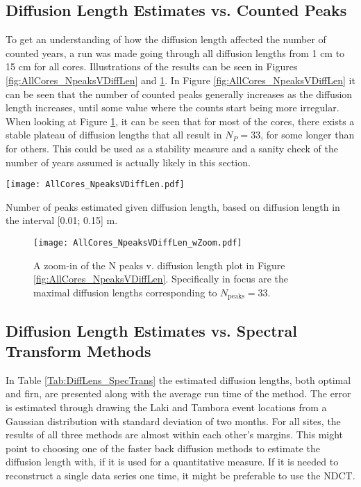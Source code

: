 \documentclass[../../CompleteThesis2/Complete_2ndDraft]{subfiles}
\begin{document}
\subsection[Diffusion Length V N Peaks]{Diffusion Length Estimates vs. Counted Peaks}
\label{Subsec:Results_DiffLenEst_AlphabetCores_DiffLenVPeaks}
To get an understanding of how the diffusion length affected the number of counted years, a run was made going through all diffusion lengths from 1 cm to 15 cm for all cores. Illustrations of the results can be seen in Figures \ref{fig:AllCores_NpeaksVDiffLen} and \ref{fig:AllCores_NpeaksVDiffLenZoom}. In Figure \ref{fig:AllCores_NpeaksVDiffLen} it can be seen that the number of counted peaks generally increases as the diffusion length increases, until some value where the counts start being more irregular. 
When looking at Figure \ref{fig:AllCores_NpeaksVDiffLenZoom}, it can be seen that for most of the cores, there exists a stable plateau of diffusion lengths that all result in $N_P=33$, for some longer than for others. This could be used as a stability measure and a sanity check of the number of years assumed is actually likely in this section. 

\begin{marginfigure}
	\centering
	\texttt{[image: AllCores\_NpeaksVDiffLen.pdf]}
	\caption[$\sigma$ vs. N Peaks]{\footnotesize Number of peaks estimated given diffusion length, based on diffusion length in the interval [0.01; 0.15] m.}
	\label{fig:AllCores_NpeaksVDiffLen}
\end{marginfigure}

\begin{figure}[h]
	\centering
	\texttt{[image: AllCores\_NpeaksVDiffLen\_wZoom.pdf]}
	\caption[$\sigma$ vs. N Peaks]{\small A zoom-in of the N peaks v. diffusion length plot in Figure \ref{fig:AllCores_NpeaksVDiffLen}. Specifically in focus are the maximal diffusion lengths corresponding to $N_{\text{peaks}}=33$.}
	\label{fig:AllCores_NpeaksVDiffLenZoom}
\end{figure}



\subsection[$\sigma$ v. Spectral Transforms]{Diffusion Length Estimates vs. Spectral Transform Methods}
\label{Subsec:Results_DiffLenEst_AlphabetCores_SpectralTransforms}
In Table \ref{Tab:DiffLens_SpecTrans} the estimated diffusion lengths, both optimal and firn, are presented along with the average run time of the method. The error is estimated through drawing the Laki and Tambora event locations from a Gaussian distribution with standard deviation of two months. For all sites, the results of all three methods are almost within each other's margins. This might point to choosing one of the faster back diffusion methods to estimate the diffusion length with, if it is used for a quantitative measure. If it is needed to reconstruct a single data series one time, it might be preferable to use the NDCT.
\end{document}
